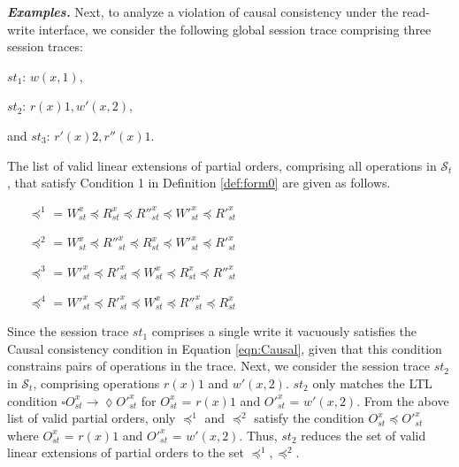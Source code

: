 \documentclass[conference]{IEEEtran}
\begin{document}
	\noindent \emph{\textbf{Examples.}}
	Next, to analyze a violation of causal consistency under the read-write interface, we consider the following global session trace comprising three  session traces:
	
	$\mathit{st}_1$: $w(x,1)$, %
	
	$\mathit{st}_2$: $r(x){1}, w'(x,2)$, %
	
	and  $\mathit{st}_3$: $r'(x){2}, r''(x){1}$.
	
	The list of valid linear extensions of partial orders, comprising all operations in $\mathcal{S}_t$, that satisfy Condition 1 in Definition \ref{def:form0} are given as follows.
	\begin{itemize}
		\item [$\preccurlyeq^1$ =] $W^x_{\mathit{st}}   \preccurlyeq R^x_{\mathit{st}}  \preccurlyeq R''^x_{\mathit{st}}  \preccurlyeq W'^x_{\mathit{st}}   \preccurlyeq R'^x_{\mathit{st}} $
		\item [$\preccurlyeq^2$ =] $ W^x_{\mathit{st}}   \preccurlyeq R''^x_{\mathit{st}}  \preccurlyeq R^x_{\mathit{st}}   \preccurlyeq W'^x_{\mathit{st}}  \preccurlyeq R'^x_{\mathit{st}}$
		\item [$\preccurlyeq^3$ =] $   W'^x_{\mathit{st}}  \preccurlyeq R'^x_{\mathit{st}} \preccurlyeq  W^x_{\mathit{st}}  \preccurlyeq R^x_{\mathit{st}} \preccurlyeq R''^x_{\mathit{st}}$
		\item [$\preccurlyeq^4$ =] $  W'^x_{\mathit{st}}  \preccurlyeq R'^x_{\mathit{st}} \preccurlyeq W^x_{\mathit{st}}  \preccurlyeq R''^x_{\mathit{st}} \preccurlyeq R^x_{\mathit{st}}  $
	\end{itemize} %
	Since the session trace  $\mathit{st}_1$ comprises a single write it vacuously satisfies the Causal consistency condition  in Equation \ref{eqn:Causal}, given that this condition constrains pairs of operations in the trace.
	Next, we consider the  session trace $\mathit{st}_2$ in $\mathcal{S}_t$, comprising operations $r(x){1}$ and $w'(x,2)$. $\mathit{st}_2$ only matches the LTL condition $ \square {\mathit{O}}^x_{\mathit{st}} \rightarrow \lozenge {\mathit{O}}'^x_{\mathit{st}}$ for ${\mathit{O}}^x_{\mathit{st}}$ = $r(x){1}$ and  ${\mathit{O}}'^x_{\mathit{st}}$ = $w'(x,2)$.  From the above list of valid partial orders, only $\preccurlyeq^1$ and $\preccurlyeq^2$ satisfy the  condition ${\mathit{O}}^x_{\mathit{st}} \preccurlyeq {\mathit{O}}'^x_{\mathit{st}}$ where ${\mathit{O}}^x_{\mathit{st}}$ = $r(x){1}$ and  ${\mathit{O}}'^x_{\mathit{st}}$ = $w'(x,2)$. Thus, $\mathit{st}_2$ reduces the set of valid linear extensions of partial orders to the set $\preccurlyeq^1, \preccurlyeq^2$.
\end{document}
